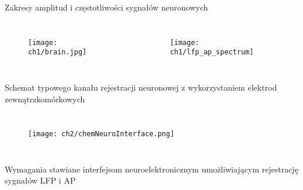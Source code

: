 



\begin{frame}{Zakresy amplitud i częstotliwości sygnałów neuronowych}
    \begin{columns}
        \begin{figure}[H]
            \texttt{[image: ch1/brain.jpg]}
          \end{figure}

        \begin{figure}[H]
            \centering
            \texttt{[image: ch1/lfp\_ap\_spectrum]}  
            \end{figure}	
    \end{columns}
    
\end{frame}



\begin{frame}{Schemat typowego kanału rejestracji neuronowej z wykorzystaniem elektrod zewnątrzkomórkowych}

    \begin{columns}
        \begin{figure}[H]
            \centering
            \texttt{[image: ch2/chemNeuroInterface.png]} 
        \end{figure}
 
    \end{columns}
\end{frame}

\begin{frame}{Wymagania stawiane interfejsom neuroelektronicznym umożliwiającym rejestrację sygnałów LFP i AP}

    
\end{frame}

